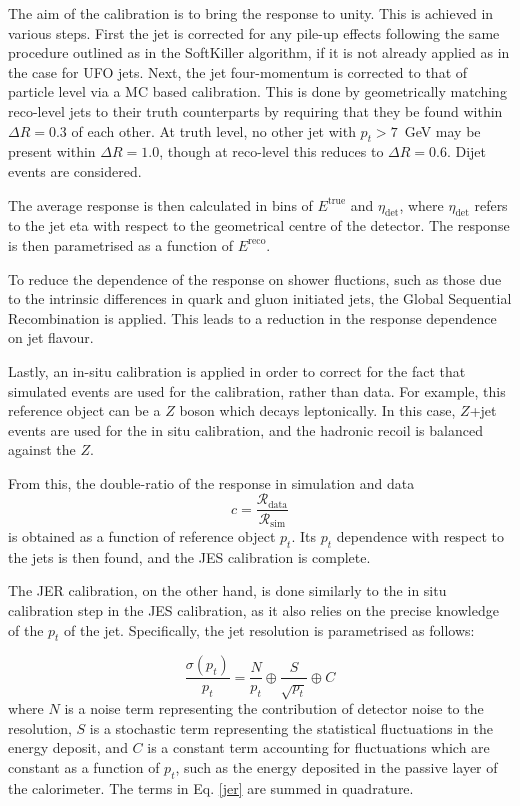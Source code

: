 \documentclass[10pt,a4paper]{book}
\begin{document}
The aim of the calibration is to bring the response to unity. This is achieved in various steps. First the jet is corrected for any pile-up effects following the same procedure outlined as in the SoftKiller algorithm, if it is not already applied as in the case for UFO jets. Next, the jet four-momentum is corrected to that of particle level via a MC based calibration. This is done by geometrically matching reco-level jets to their truth counterparts by requiring that they be found within $\Delta R = 0.3$ of each other. At truth level, no other jet with $p_t > 7$~GeV may be present within $\Delta R = 1.0$, though at reco-level this reduces to $\Delta R = 0.6$. Dijet events are considered. 

The average response is then calculated in bins of $E^{\text{true}}$ and $\eta_{\text{det}}$, where $\eta_{\text{det}}$ refers to the jet eta with respect to the geometrical centre of the detector. The response is then parametrised as a function of $E^{\text{reco}}$.

To reduce the dependence of the response on shower fluctions, such as those due to the intrinsic differences in quark and gluon initiated jets, the Global Sequential Recombination is applied. This leads to a reduction in the response dependence on jet flavour.

Lastly, an in-situ calibration is applied in order to correct for the fact that simulated events are used for the calibration, rather than data. For example, this reference object can be a $Z$ boson which decays leptonically. In this case, $Z$+jet events are used for the in situ calibration, and the hadronic recoil is balanced against the $Z$. 

From this, the double-ratio of the response in simulation and data
\begin{equation}
    c = \frac{\mathcal{R}_{\text{data}}}{\mathcal{R}_{\text{sim}}}
\end{equation}
is obtained as a function of reference object $p_t$. Its $p_t$ dependence with respect to the jets is then found, and the JES calibration is complete.

The JER calibration, on the other hand, is done similarly to the in situ calibration step in the JES calibration, as it also relies on the precise knowledge of the $p_t$ of the jet. Specifically, the jet resolution is parametrised as follows:

\begin{equation}
    \frac{\sigma(p_t)}{p_t} = \frac{N}{p_t} \oplus \frac{S}{\sqrt{p_t}} \oplus C 
    \label{jer}
\end{equation}
where $N$ is a noise term representing the contribution of detector noise to the resolution, $S$ is a stochastic term representing the statistical fluctuations in the energy deposit, and $C$ is a constant term accounting for fluctuations which are constant as a function of $p_t$, such as the energy deposited in the passive layer of the calorimeter. The terms in Eq. \ref{jer} are summed in quadrature. 
\end{document}
